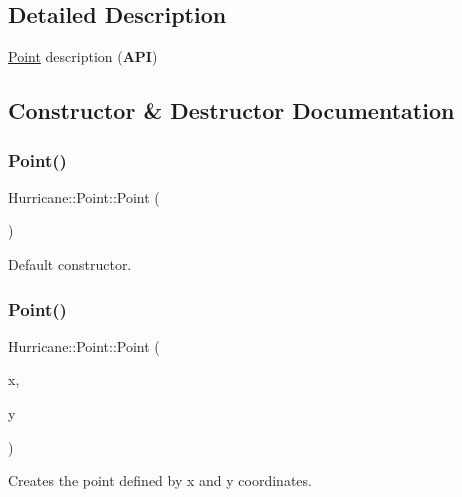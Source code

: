 \subsection{Detailed Description}
\hyperlink{classHurricane_1_1Point}{Point} description ({\bfseries A\+PI}) 

\subsection{Constructor \& Destructor Documentation}
\mbox{\label{classHurricane_1_1Point_a54c8ad2b1f3005ac1564c0fd7d5ef5b7}} 
\subsubsection{\texorpdfstring{Point()}{Point()}\hspace{0.1cm}{\footnotesize\ttfamily [1/3]}}
{\footnotesize\ttfamily Hurricane\+::\+Point\+::\+Point (\begin{DoxyParamCaption}{ }\end{DoxyParamCaption})}

Default constructor. \mbox{\label{classHurricane_1_1Point_a871672d833661cc79101d1e43d4d8325}} 
\subsubsection{\texorpdfstring{Point()}{Point()}\hspace{0.1cm}{\footnotesize\ttfamily [2/3]}}
{\footnotesize\ttfamily Hurricane\+::\+Point\+::\+Point (\begin{DoxyParamCaption}\item[{const \hyperlink{group__DbUGroup_ga4fbfa3e8c89347af76c9628ea06c4146}{Db\+U\+::\+Unit} \&}]{x,  }\item[{const \hyperlink{group__DbUGroup_ga4fbfa3e8c89347af76c9628ea06c4146}{Db\+U\+::\+Unit} \&}]{y }\end{DoxyParamCaption})}

Creates the point defined by x and y coordinates. \mbox{\label{classHurricane_1_1Point_a8840ca5f42bec6203058911ea0ba6cb9}} 

